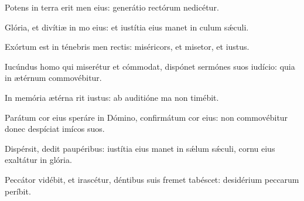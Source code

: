 \item {}

\item Potens in terra erit men eius:\psstar{} generátio rectórum nedicétur.

\item Glória, et divítiæ in mo eius:\psstar{} et iustítia eius manet in culum sǽculi.

\item Exórtum est in ténebris men rectis:\psstar{} miséricors, et misetor, et iustus.

\item Iucúndus homo qui miserétur et cómmodat,\pscross{} dispónet sermónes suos  iudício:\psstar{} quia in ætérnum  commovébitur.

\item In memória ætérna rit iustus:\psstar{} ab auditióne ma non timébit.

\item Parátum cor eius speráre in Dómino,\pscross{} confirmátum  cor eius:\psstar{} non commovébitur donec despíciat imícos suos.

\item Dispérsit, dedit paupéribus:\pscross{} iustítia eius manet in sǽlum sǽculi,\psstar{} cornu eius exaltátur in glória.

\item Peccátor vidébit, et irascétur,\pscross{} déntibus suis fremet  tabéscet:\psstar{} desidérium peccarum períbit.